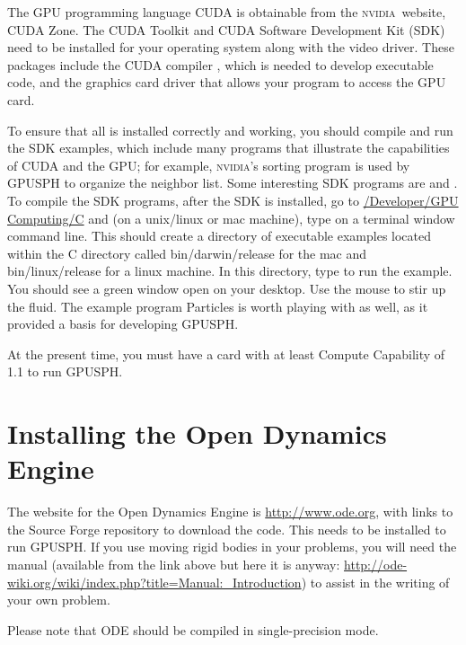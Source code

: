 \documentclass[12pt]{memoir}
\newcommand{\nvidia}{\textsc{nvidia}}
\begin{document}
The GPU programming language CUDA is obtainable from the \nvidia\ website,
CUDA Zone. The CUDA Toolkit and CUDA Software Development Kit (SDK)
need to be installed for your operating system along with the video
driver. These packages include the CUDA compiler , which is
needed to develop executable code, and the graphics card driver that
allows your program to access the GPU card.

To ensure that all is installed correctly and working, you should
compile and run the SDK examples, which include many programs that
illustrate the capabilities of CUDA and the GPU; for example, \nvidia's
sorting program  is used by GPUSPH to organize the
neighbor list. Some interesting SDK programs are  and
. To compile the SDK programs, after the SDK is
installed, go to \url{/Developer/GPU Computing/C} and (on a unix/linux
or mac machine), type  on a terminal window command line. This
should create a directory of executable examples located within the C
directory called bin/darwin/release for the mac and bin/linux/release
for a linux machine. In this directory, type  to run
the  example. You should see a green window open on your
desktop. Use the mouse to stir up the fluid. The example program
Particles is worth playing with as well, as it provided a basis for
developing GPUSPH.

At the present time, you must have a card with at least Compute
Capability of 1.1 to run GPUSPH.


\section{Installing the Open Dynamics Engine}

The website for the Open Dynamics Engine is \url{http://www.ode.org},
with links to the Source Forge repository to download the code. This
needs to be installed to run GPUSPH. If you use moving rigid bodies in
your problems, you will need the manual (available from the link above
but here it is anyway:
\url{http://ode-wiki.org/wiki/index.php?title=Manual:_Introduction}) to
assist in the writing of your own problem.

Please note that ODE should be compiled in single-precision mode.

\end{document}
